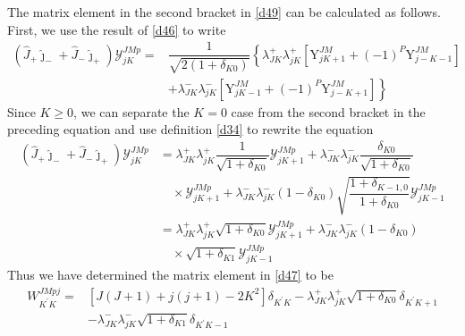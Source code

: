 \documentclass[]{article}
\begin{document}
The matrix element in the second bracket in \eqref{d49} can be calculated as follows. First, we use the result of \eqref{d46} to write
\begin{align}
	(\hat{J}_+\hat{\jmath}_-+\hat{J}_-\hat{\jmath}_+)\mathcal{Y}^{JMp}_{jK}=&\dfrac{1}{\sqrt{2(1+\delta_{K0})}}\left\lbrace \lambda^+_{JK}\lambda^+_{jK}[\mathrm{Y}^{JM}_{jK+1}+(-1)^P\mathrm{Y}^{JM}_{j-K-1}]\right. \nonumber\\
	&\left.+\lambda^-_{JK}\lambda^-_{jK}[\mathrm{Y}^{JM}_{jK-1}+(-1)^P\mathrm{Y}^{JM}_{j-K+1}]\right\rbrace 
\end{align} 
Since $K\geqslant0$, we can separate the $K=0$ case from the second bracket in the preceding equation and use definition \eqref{d34} to rewrite the equation
\begin{align}
	(\hat{J}_+\hat{\jmath}_-+\hat{J}_-\hat{\jmath}_+)\mathcal{Y}^{JMp}_{jK}&=\lambda^+_{JK}\lambda^+_{jK}\dfrac{1}{\sqrt{1+\delta_{K0}}}\mathcal{Y}^{JMp}_{jK+1}+\lambda^-_{JK}\lambda^-_{jK}\dfrac{\delta_{K0}}{\sqrt{1+\delta_{K0}}}\nonumber\\
	&\quad\times\mathcal{Y}^{JMp}_{jK+1}+\lambda^-_{JK}\lambda^-_{jK}(1-\delta_{K0})\sqrt{\dfrac{1+\delta_{K-1,0}}{1+\delta_{K0}}}\mathcal{Y}^{JMp}_{jK-1}\nonumber\\
	&=\lambda^+_{JK}\lambda^+_{jK}\sqrt{1+\delta_{K0}}\mathcal{Y}^{JMp}_{jK+1}+\lambda^-_{JK}\lambda^-_{jK}(1-\delta_{K0})\nonumber\\
	&\quad\times\sqrt{1+\delta_{K1}}\mathcal{Y}^{JMp}_{jK-1}
\end{align}
Thus we have determined the matrix element in \eqref{d47} to be
\begin{align}
	W^{JMpj}_{K^\prime K}=&[J(J+1)+j(j+1)-2K^2]\delta_{K^\prime K}-\lambda^+_{JK}\lambda^+_{jK}\sqrt{1+\delta_{K0}}\delta_{K^\prime K+1}\nonumber\\
	&-\lambda^-_{JK}\lambda^-_{jK}\sqrt{1+\delta_{K1}}\delta_{K^\prime K-1}
	\label{d52}
\end{align}
\end{document}

